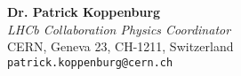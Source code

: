 \documentclass[margin, 10pt]{res} %
\begin{document}
\begin{resume}
\textbf{Dr. Patrick Koppenburg} \\
\textit{LHCb Collaboration Physics Coordinator} \\
CERN, Geneva 23, CH-1211, Switzerland \\
\texttt{patrick.koppenburg@cern.ch}






\end{resume}
\end{document}
